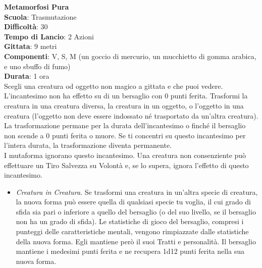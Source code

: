 \begin{multicols}{2}
\medskip\textbf{Metamorfosi Pura}\\
\textbf{Scuola}: Trasmutazione\\
\textbf{Difficoltà}: 30\\
\textbf{Tempo di Lancio}: 2 Azioni\\
\textbf{Gittata}: 9 metri\\
\textbf{Componenti}: V, S, M (un goccio di mercurio, un mucchietto di gomma arabica, e uno sbuffo di fumo) \\
\textbf{Durata}: 1 ora \\
Scegli una creatura od oggetto non magico a gittata e che puoi vedere. L'incantesimo non ha effetto su di un bersaglio con 0 punti ferita. Trasformi la creatura in una creatura diversa, la creatura in un oggetto, o l'oggetto in una creatura (l'oggetto non deve essere indossato né trasportato da un'altra creatura). La trasformazione permane per la durata dell'incantesimo o finché il bersaglio non scende a 0 punti ferita o muore. Se ti concentri su questo incantesimo per l'intera durata, la trasformazione diventa permanente.\\
I mutaforma ignorano questo incantesimo. Una creatura non consenziente può effettuare un Tiro Salvezza su Volontà e, se lo supera, ignora l'effetto di questo incantesimo.\\
\medskip\begin{itemize}
\item
\textit{Creatura in Creatura}. Se trasformi una creatura in un'altra specie di creatura, la nuova forma può essere quella di qualsiasi specie tu voglia, il cui grado di sfida sia pari o inferiore a quello del bersaglio (o del suo livello, se il bersaglio non ha un grado di sfida). Le statistiche di gioco del bersaglio, compresi i punteggi delle caratteristiche mentali, vengono rimpiazzate dalle statistiche della nuova forma. Egli mantiene però il suoi Tratti e personalità. Il bersaglio mantiene i medesimi punti ferita e ne recupera 1d12 punti ferita nella sua nuova forma.\\

\end{itemize}
\end{multicols}
